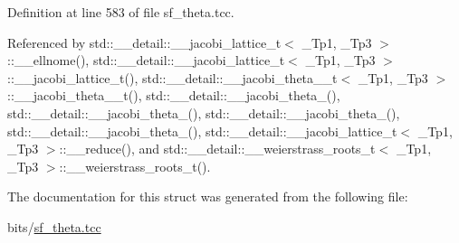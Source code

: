 Definition at line 583 of file sf\+\_\+theta.\+tcc.



Referenced by std\+::\+\_\+\+\_\+detail\+::\+\_\+\+\_\+jacobi\+\_\+lattice\+\_\+t$<$ \+\_\+\+Tp1, \+\_\+\+Tp3 $>$\+::\+\_\+\+\_\+ellnome(), std\+::\+\_\+\+\_\+detail\+::\+\_\+\+\_\+jacobi\+\_\+lattice\+\_\+t$<$ \+\_\+\+Tp1, \+\_\+\+Tp3 $>$\+::\+\_\+\+\_\+jacobi\+\_\+lattice\+\_\+t(), std\+::\+\_\+\+\_\+detail\+::\+\_\+\+\_\+jacobi\+\_\+theta\+\_\+\_\+t$<$ \+\_\+\+Tp1, \+\_\+\+Tp3 $>$\+::\+\_\+\+\_\+jacobi\+\_\+theta\+\_\+\_\+t(), std\+::\+\_\+\+\_\+detail\+::\+\_\+\+\_\+jacobi\+\_\+theta\+\_(), std\+::\+\_\+\+\_\+detail\+::\+\_\+\+\_\+jacobi\+\_\+theta\+\_(), std\+::\+\_\+\+\_\+detail\+::\+\_\+\+\_\+jacobi\+\_\+theta\+\_(), std\+::\+\_\+\+\_\+detail\+::\+\_\+\+\_\+jacobi\+\_\+theta\+\_(), std\+::\+\_\+\+\_\+detail\+::\+\_\+\+\_\+jacobi\+\_\+lattice\+\_\+t$<$ \+\_\+\+Tp1, \+\_\+\+Tp3 $>$\+::\+\_\+\+\_\+reduce(), and std\+::\+\_\+\+\_\+detail\+::\+\_\+\+\_\+weierstrass\+\_\+roots\+\_\+t$<$ \+\_\+\+Tp1, \+\_\+\+Tp3 $>$\+::\+\_\+\+\_\+weierstrass\+\_\+roots\+\_\+t().



The documentation for this struct was generated from the following file\+:\begin{DoxyCompactItemize}
\item 
bits/\hyperlink{sf__theta_8tcc}{sf\+\_\+theta.\+tcc}\end{DoxyCompactItemize}
